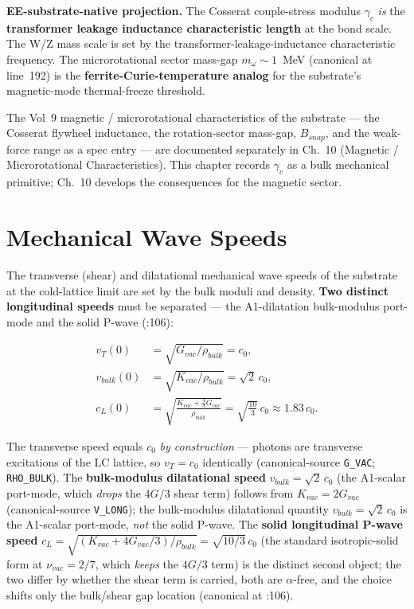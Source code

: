 \textbf{EE-substrate-native projection.} The Cosserat couple-stress modulus $\gamma_c$ \emph{is} the \textbf{transformer leakage inductance characteristic length} at the bond scale. The W/Z mass scale is set by the transformer-leakage-inductance characteristic frequency. The microrotational sector mass-gap $m_\omega \sim 1$~MeV (canonical at  line~192) is the \textbf{ferrite-Curie-temperature analog} for the substrate's magnetic-mode thermal-freeze threshold.

The Vol~9 magnetic / microrotational characteristics of the substrate --- the Cosserat flywheel inductance, the rotation-sector mass-gap, $B_{snap}$, and the weak-force range as a spec entry --- are documented separately in Ch.~10 (Magnetic / Microrotational Characteristics). This chapter records $\gamma_c$ as a bulk mechanical primitive; Ch.~10 develops the consequences for the magnetic sector.

\section{Mechanical Wave Speeds}
\label{sec:vol9_mech_wave_speeds}

The transverse (shear) and dilatational mechanical wave speeds of the substrate at the cold-lattice limit are set by the bulk moduli and density. \textbf{Two distinct longitudinal speeds} must be separated --- the A1-dilatation bulk-modulus port-mode and the solid P-wave (:106):

\begin{align}
v_T(0) &= \sqrt{G_{vac} / \rho_{bulk}} = c_0, \nonumber \\
v_{bulk}(0) &= \sqrt{K_{vac} / \rho_{bulk}} = \sqrt{2}\, c_0, \nonumber \\
c_L(0) &= \sqrt{\frac{K_{vac} + \tfrac{4}{3}G_{vac}}{\rho_{bulk}}} = \sqrt{\tfrac{10}{3}}\, c_0 \approx 1.83\, c_0. \nonumber
\end{align}

The transverse speed equals $c_0$ \emph{by construction} --- photons are transverse excitations of the LC lattice, so $v_T = c_0$ identically (canonical-source  \texttt{G\_VAC};  \texttt{RHO\_BULK}). The \textbf{bulk-modulus dilatational speed} $v_{bulk} = \sqrt{2}\, c_0$ (the A1-scalar port-mode, which \emph{drops} the $4G/3$ shear term) follows from $K_{vac} = 2 G_{vac}$ (canonical-source  \texttt{V\_LONG}); the bulk-modulus dilatational quantity $v_{bulk}=\sqrt{2}\,c_0$ is the A1-scalar port-mode, \emph{not} the solid P-wave. The \textbf{solid longitudinal P-wave speed} $c_L = \sqrt{(K_{vac}+4G_{vac}/3)/\rho_{bulk}} = \sqrt{10/3}\, c_0$ (the standard isotropic-solid form at $\nu_{vac}=2/7$, which \emph{keeps} the $4G/3$ term) is the distinct second object; the two differ by whether the shear term is carried, both are $\alpha$-free, and the choice shifts only the bulk/shear gap location (canonical at :106).

